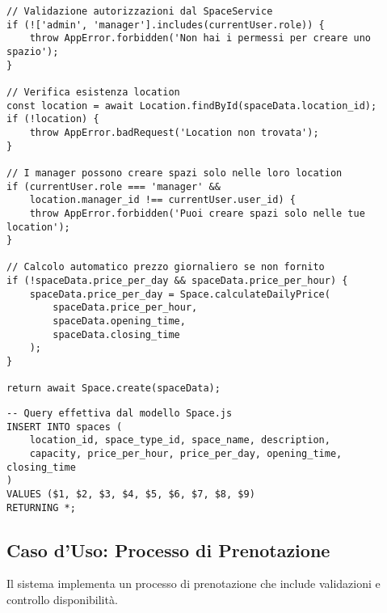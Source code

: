 \begin{lstlisting}[caption=Creazione Spazio con Autorizzazioni (SpaceService.js)]
// Validazione autorizzazioni dal SpaceService
if (!['admin', 'manager'].includes(currentUser.role)) {
    throw AppError.forbidden('Non hai i permessi per creare uno spazio');
}

// Verifica esistenza location
const location = await Location.findById(spaceData.location_id);
if (!location) {
    throw AppError.badRequest('Location non trovata');
}

// I manager possono creare spazi solo nelle loro location
if (currentUser.role === 'manager' && 
    location.manager_id !== currentUser.user_id) {
    throw AppError.forbidden('Puoi creare spazi solo nelle tue location');
}

// Calcolo automatico prezzo giornaliero se non fornito
if (!spaceData.price_per_day && spaceData.price_per_hour) {
    spaceData.price_per_day = Space.calculateDailyPrice(
        spaceData.price_per_hour, 
        spaceData.opening_time, 
        spaceData.closing_time
    );
}

return await Space.create(spaceData);
\end{lstlisting}

\begin{lstlisting}[caption=Query SQL di Creazione Spazio]
-- Query effettiva dal modello Space.js
INSERT INTO spaces (
    location_id, space_type_id, space_name, description, 
    capacity, price_per_hour, price_per_day, opening_time, closing_time
)
VALUES ($1, $2, $3, $4, $5, $6, $7, $8, $9)
RETURNING *;
\end{lstlisting}

\newpage

\subsection{Caso d'Uso: Processo di Prenotazione}

Il sistema implementa un processo di prenotazione che include validazioni e controllo disponibilità.

